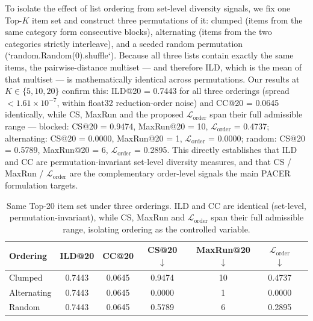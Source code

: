 %


To isolate the effect of list ordering from set-level diversity signals, we
fix one Top-$K$ item set and construct three permutations of it: clumped
(items from the same category form consecutive blocks), alternating (items
from the two categories strictly interleave), and a seeded random
permutation (`random.Random(0).shuffle`). Because all three lists contain
exactly the same items, the pairwise-distance multiset --- and therefore ILD,
which is the mean of that multiset --- is mathematically identical across
permutations. Our results at $K\in\{5,10,20\}$ confirm this: ILD@20 =
0.7443 for all three orderings (spread $<1.61\times10^{-7}$, within float32
reduction-order noise) and CC@20 = 0.0645 identically, while CS, MaxRun and
the proposed $\mathcal{L}_{\text{order}}$ span their full admissible range
--- blocked: CS@20 = 0.9474, MaxRun@20 = 10, $\mathcal{L}_{\text{order}}$ =
0.4737; alternating: CS@20 = 0.0000, MaxRun@20 = 1,
$\mathcal{L}_{\text{order}}$ = 0.0000; random: CS@20 = 0.5789, MaxRun@20 =
6, $\mathcal{L}_{\text{order}}$ = 0.2895. This directly establishes that
ILD and CC are permutation-invariant set-level diversity measures, and that
CS / MaxRun / $\mathcal{L}_{\text{order}}$ are the complementary order-level
signals the main PACER formulation targets.

\begin{table}[t]
\centering
\caption{Same Top-20 item set under three orderings. ILD and CC are identical
(set-level, permutation-invariant), while CS, MaxRun and
$\mathcal{L}_{\text{order}}$ span their full admissible range, isolating
ordering as the controlled variable.}
\label{tab:same_set_diff_order}
\vspace{1mm}
\begin{tabular}{lcccccc}
\toprule
Ordering    & ILD@20 & CC@20  & CS@20 $\downarrow$ & MaxRun@20 $\downarrow$ & $\mathcal{L}_{\text{order}}$ $\downarrow$ \\
\midrule
Clumped     & 0.7443 & 0.0645 & 0.9474             & 10                     & 0.4737 \\
Alternating & 0.7443 & 0.0645 & 0.0000             &  1                     & 0.0000 \\
Random      & 0.7443 & 0.0645 & 0.5789             &  6                     & 0.2895 \\
\bottomrule
\end{tabular}
\end{table}


